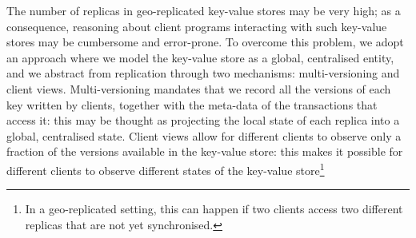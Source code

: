 The number of replicas in geo-replicated key-value stores may be very high; as a 
consequence, reasoning about client programs interacting with such key-value 
stores may be cumbersome and error-prone. To overcome this problem, we adopt 
an approach where we model the key-value store as a global, centralised entity, and 
we abstract from replication through two mechanisms: multi-versioning 
and client views. Multi-versioning mandates that we record all the versions of each key 
written by clients, together with the meta-data of the transactions that access it: this 
may be thought as projecting the local state of each replica into a global, centralised state. 
Client views allow for different clients to observe only a fraction of the versions available in 
the key-value store: this makes it possible for different clients to observe different states 
of the key-value store\footnote{In a geo-replicated setting, this can happen if two clients access 
two different replicas that are not yet synchronised.}

